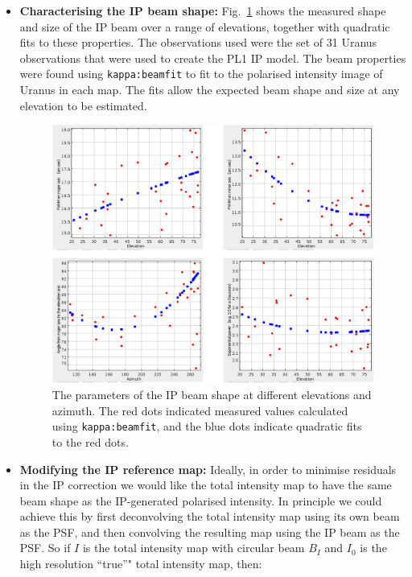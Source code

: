\documentclass[twoside,11pt]{starlink}
\begin{document}
\begin{itemize}
\item {\bf Characterising the IP beam shape:}
Fig.~\ref{fig:ip1} shows the measured shape and size of the IP beam over
a range of elevations, together with quadratic fits to these properties.
The observations used were the set of 31 Uranus observations that were
used to create the PL1 IP model. The beam properties were found using
\texttt{kappa:beamfit} to fit to the polarised intensity image of
Uranus in each map. The fits allow the expected beam shape and size at any
elevation to be estimated.

\begin{figure}
\includegraphics[width=\columnwidth]{ip1}
\caption{The parameters of the IP beam shape at different elevations and
azimuth. The red dots indicated measured values calculated using
\texttt{kappa:beamfit}, and the blue dots indicate quadratic fits to the
red dots.}
\label{fig:ip1}
\end{figure}

\item {\bf Modifying the IP reference map:}
Ideally, in order to minimise residuals in the IP correction we would
like the total intensity map to have the same beam shape as the
IP-generated polarised intensity. In principle we could achieve this by
first deconvolving the total intensity map using its own beam as the PSF,
and then convolving the resulting map using the IP beam as the PSF. So if
$I$ is the total intensity map with circular beam $B_{I}$ and $I_{0}$ is
the high resolution ``true''" total intensity map, then:


\end{itemize}
\end{document}
